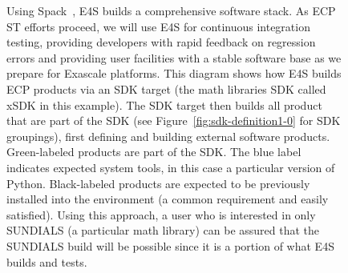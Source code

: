 \begin{figure}
		\centering
	\caption{Using Spack~\cite{gamblin+:ecp18-spack-tutorial}, E4S builds a comprehensive software stack.  As ECP ST efforts proceed, we will use E4S for continuous integration testing, providing developers with rapid feedback on regression errors and providing user facilities with a stable software base as we prepare for Exascale platforms.  This diagram shows how E4S builds ECP products via an SDK target (the math libraries SDK called xSDK in this example).  The SDK target then builds all product that are part of the SDK (see Figure~\ref{fig:sdk-definition1-0} for SDK groupings), first defining and building external software products. Green-labeled products are part of the SDK. The blue label indicates expected system tools, in this case a particular version of Python.  Black-labeled products are expected to be previously installed into the environment (a common requirement and easily satisfied).  Using this approach, a user who is interested in only SUNDIALS (a particular math library) can be assured that the SUNDIALS build will be possible since it is a portion of what E4S builds and tests.}
	\label{fig:e4s-build-tree}
\end{figure}


